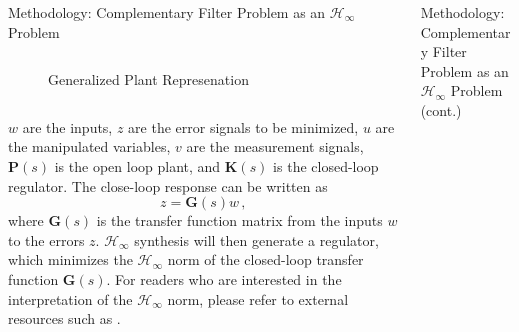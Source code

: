 \documentclass{beamer}
\begin{document}
\begin{frame}[t]
\begin{columns}[t]
\begin{column}{0.32\linewidth}
\begin{block}{Methodology: Complementary Filter Problem as an $\mathcal{H}_\infty$ Problem}
\begin{columns}[t, onlytextwidth]
\begin{column}{0.45\textwidth}
\begin{figure}
						\caption{Generalized Plant Represenation}
						\label{fig:generalized_plant_representation}
					\end{figure}
				\end{column}
			\end{columns}
			$w$ are the inputs, $z$ are the error signals to be minimized, $u$ are the manipulated variables, $v$ are the measurement signals, $\mathbf{P}(s)$ is the open loop plant, and $\mathbf{K}(s)$ is the closed-loop regulator.
%					
%					
			The close-loop response can be written as
			\begin{equation}
				z=\mathbf{G}(s)w\,,
			\end{equation}
			where $\mathbf{G}(s)$ is the transfer function matrix from the inputs $w$ to the errors $z$.
			$\mathcal{H}_\infty$ synthesis will then generate a regulator, which minimizes the $\mathcal{H}_\infty$ norm of the closed-loop transfer function $\mathbf{G}(s)$.
			For readers who are interested in the interpretation of the $\mathcal{H}_\infty$ norm, please refer to external resources such as \cite{Thomas:2019, multivariable_feedback_control}.
			\end{block}
		\end{column}
		
		\begin{column}{0.32\linewidth}
			\begin{block}{Methodology: Complementary Filter Problem as an $\mathcal{H}_\infty$ Problem (cont.)}
			
		
		
			

\end{block}
\end{column}
\end{columns}
\end{frame}
\end{document}
